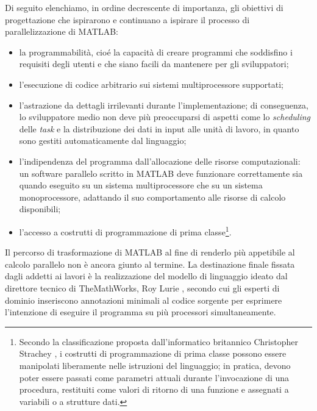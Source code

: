 Di seguito elenchiamo, in ordine decrescente di importanza, gli obiettivi di progettazione che ispirarono e continuano a ispirare il processo di parallelizzazione di MATLAB:
\begin{itemize}
    \item la programmabilit\`a, cio\'e la capacit\`a di creare programmi che soddisfino i requisiti degli utenti e che siano facili da mantenere per gli sviluppatori;
    \item l'esecuzione di codice arbitrario sui sistemi multiprocessore supportati;
    \item l'astrazione da dettagli irrilevanti durante l'implementazione; di conseguenza, lo sviluppatore medio non deve pi\`u preoccuparsi di aspetti come lo \textit{scheduling} delle \textit{task} e la distribuzione dei dati in input alle unit\`a di lavoro, in quanto sono gestiti automaticamente dal linguaggio;
    \item l'indipendenza del programma dall'allocazione delle risorse computazionali: un software parallelo scritto in MATLAB deve funzionare correttamente sia quando eseguito su un sistema multiprocessore che su un sistema monoprocessore, adattando il suo comportamento alle risorse di calcolo disponibili;
    \item l'accesso a costrutti di programmazione di prima classe\footnote{Secondo la classificazione proposta dall'informatico britannico Christopher Strachey \cite{SICP96}, i costrutti di programmazione di prima classe possono essere manipolati liberamente nelle istruzioni del linguaggio; in pratica, devono poter essere passati come parametri attuali durante l'invocazione di una procedura, restituiti come valori di ritorno di una funzione e assegnati a variabili o a strutture dati.}. 
\end{itemize}
Il percorso di trasformazione di MATLAB al fine di renderlo pi\`u appetibile al calcolo parallelo non \`e ancora giunto al termine. \newline La destinazione finale fissata 
dagli addetti ai lavori \`e la realizzazione del modello di linguaggio ideato dal direttore tecnico di TheMathWorks, Roy Lurie \cite{Lurie2007},
secondo cui gli esperti di dominio inseriscono annotazioni minimali al codice sorgente per esprimere l'intenzione di eseguire il programma 
su pi\`u processori simultaneamente.
